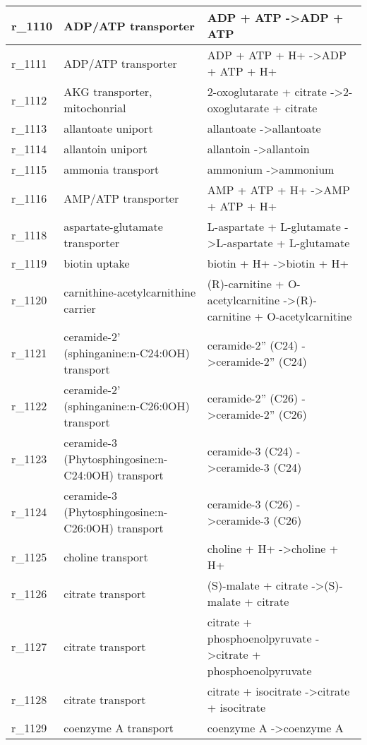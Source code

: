 \begin{landscape}
{\begin{longtable}{|l|p{7cm}|p{15cm}|}
r\_1110 & ADP/ATP transporter & ADP + ATP  -\textgreater ADP + ATP \\ \hline
r\_1111 & ADP/ATP transporter & ADP + ATP + H+  -\textgreater ADP + ATP + H+ \\ \hline
r\_1112 & AKG transporter, mitochonrial & 2-oxoglutarate + citrate  -\textgreater 2-oxoglutarate + citrate \\ \hline
r\_1113 & allantoate uniport & allantoate  -\textgreater allantoate \\ \hline
r\_1114 & allantoin uniport & allantoin  -\textgreater allantoin \\ \hline
r\_1115 & ammonia transport & ammonium  -\textgreater ammonium \\ \hline
r\_1116 & AMP/ATP transporter & AMP + ATP + H+  -\textgreater AMP + ATP + H+ \\ \hline
r\_1118 & aspartate-glutamate transporter & L-aspartate + L-glutamate  -\textgreater L-aspartate + L-glutamate \\ \hline
r\_1119 & biotin uptake & biotin + H+  -\textgreater biotin + H+ \\ \hline
r\_1120 & carnithine-acetylcarnithine carrier & (R)-carnitine + O-acetylcarnitine  -\textgreater (R)-carnitine + O-acetylcarnitine \\ \hline
r\_1121 & ceramide-2' (sphinganine:n-C24:0OH) transport & ceramide-2'' (C24)  -\textgreater ceramide-2'' (C24) \\ \hline
r\_1122 & ceramide-2' (sphinganine:n-C26:0OH) transport & ceramide-2'' (C26)  -\textgreater ceramide-2'' (C26) \\ \hline
r\_1123 & ceramide-3 (Phytosphingosine:n-C24:0OH) transport & ceramide-3 (C24)  -\textgreater ceramide-3 (C24) \\ \hline
r\_1124 & ceramide-3 (Phytosphingosine:n-C26:0OH) transport & ceramide-3 (C26)  -\textgreater ceramide-3 (C26) \\ \hline
r\_1125 & choline transport & choline + H+  -\textgreater choline + H+ \\ \hline
r\_1126 & citrate transport & (S)-malate + citrate  -\textgreater (S)-malate + citrate \\ \hline
r\_1127 & citrate transport & citrate + phosphoenolpyruvate  -\textgreater citrate + phosphoenolpyruvate \\ \hline
r\_1128 & citrate transport & citrate + isocitrate  -\textgreater citrate + isocitrate \\ \hline
r\_1129 & coenzyme A transport & coenzyme A  -\textgreater coenzyme A \\ \hline

\end{longtable}}
\end{landscape}
